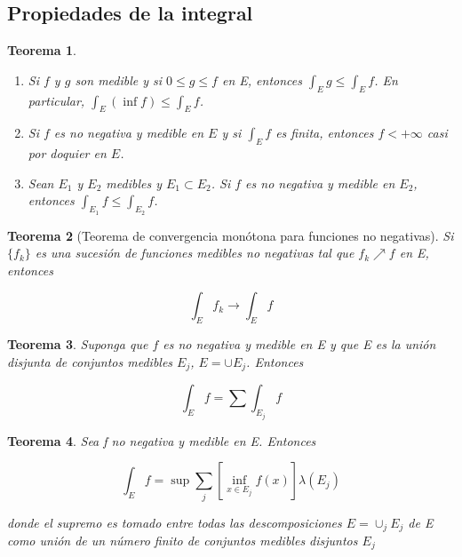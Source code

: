 \documentclass{article}
\newtheorem{theorem}{Teorema}
\begin{document}
\subsection{Propiedades de la integral}
\begin{theorem}
\begin{enumerate}[label=(\roman*)]
\item Si $f$ y $g$ son medible y si $0 \leq g \leq f$ en E, entonces $\int_E g \leq \int_E f$. En particular, $\int_E(\inf f) \leq \int_E f$.

\item Si $f$ es no negativa y medible en $E$ y si $\int_E f$ es finita, entonces $f < +\infty$ casi por doquier en $E$.

\item Sean $E_1$ y $E_2$ medibles y $E_1 \subset E_2$. Si $f$ es no negativa y medible en $E_2$, entonces $\int_{E_1} f \leq \int_{E_2} f$.

\end{enumerate}
\end{theorem}

\begin{theorem}[Teorema de convergencia monótona para funciones no negativas]
Si $\{f_k\}$ es una sucesión de funciones medibles no negativas tal que $f_k \nearrow f$ en E, entonces

\begin{equation*}
\int_E f_k \rightarrow \int_E f
\end{equation*}

\end{theorem}

\begin{theorem}
Suponga que $f$ es no negativa y medible en E y que E es la unión disjunta de conjuntos medibles $E_j$, $E = \cup E_j$. Entonces

\begin{equation*}
\int_E f = \sum \int_{E_j} f
\end{equation*}

\end{theorem}

\begin{theorem}
Sea f no negativa y medible en E. Entonces

\begin{equation*}
\int_E f = \sup \sum_j [\inf_{x \in E_j} f(x)] \lambda(E_j)
\end{equation*}

donde el supremo es tomado entre todas las descomposiciones $E = \cup_j E_j$ de E como unión de un número finito de conjuntos medibles disjuntos $E_j$
\end{theorem}
\end{document}
